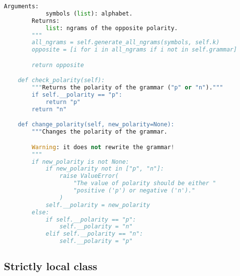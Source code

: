 \begin{lstlisting}[language=Python]
        Arguments:
            symbols (list): alphabet.
        Returns:
            list: ngrams of the opposite polarity.
        """
        all_ngrams = self.generate_all_ngrams(symbols, self.k)
        opposite = [i for i in all_ngrams if i not in self.grammar]

        return opposite

    def check_polarity(self):
        """Returns the polarity of the grammar ("p" or "n")."""
        if self.__polarity == "p":
            return "p"
        return "n"

    def change_polarity(self, new_polarity=None):
        """Changes the polarity of the grammar.

        Warning: it does not rewrite the grammar!
        """
        if new_polarity is not None:
            if new_polarity not in ["p", "n"]:
                raise ValueError(
                    "The value of polarity should be either "
                    "positive ('p') or negative ('n')."
                )
            self.__polarity = new_polarity
        else:
            if self.__polarity == "p":
                self.__polarity = "n"
            elif self.__polarity == "n":
                self.__polarity = "p"
\end{lstlisting}

\subsection*{Strictly local class}

